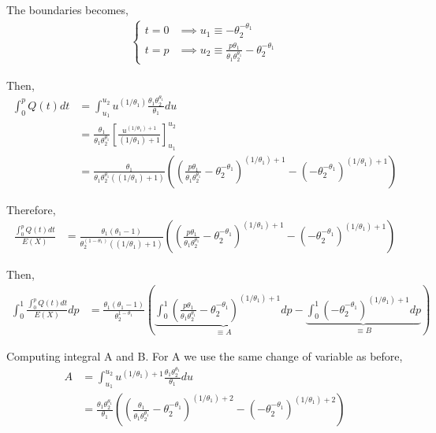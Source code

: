 \documentclass[10pt, a4paper, nofootinbib]{scrartcl}
\begin{document}
The boundaries becomes, 
\begin{align*}
  \begin{cases}
    t = 0 &\implies u_1 \equiv - \theta_2^{-\theta_1} \\
    t = p &\implies u_2 \equiv \frac{p \theta_1}{\theta_1 \theta_2^{\theta_1}} - \theta_2^{-\theta_1}
  \end{cases}
\end{align*}

Then, 
\begin{align*}
  \int_0^p Q(t) dt 
    &= \int_{u_1}^{u_2} u^{(1/\theta_1)} \frac{\theta_1 \theta_2^{\theta_1}}{\theta_1} du \\
    &= \frac{\theta_1}{\theta_1 \theta_2^{\theta_1}} \left[ \frac{u^{(1/\theta_1) + 1}}{(1/\theta_1) + 1} \right]_{u_1}^{u_2} \\
    &= \frac{\theta_1}{\theta_1 \theta_2^{\theta_1} ((1/\theta_1) + 1)} \left( \left( \frac{p \theta_1}{\theta_1 \theta_2^{\theta_1}} - \theta_2^{-\theta_1} \right)^{(1/\theta_1) + 1} - \left( - \theta_2^{-\theta_1} \right)^{(1/\theta_1) + 1} \right)
\end{align*}

Therefore, 
\begin{align*}
  \frac{\int_{0}^{p} Q(t) dt}{E(X)}
    &= \frac{\theta_1(\theta_1 - 1)}{\theta_2^{(1 - \theta_1)} ((1/\theta_1) + 1)} \left( \left( \frac{p \theta_1}{\theta_1 \theta_2^{\theta_1}} - \theta_2^{-\theta_1} \right)^{(1/\theta_1) + 1} - \left( - \theta_2^{-\theta_1} \right)^{(1/\theta_1) + 1} \right)
\end{align*}

Then,
\begin{align*}
  \int_{0}^{1} \frac{\int_{0}^{p} Q(t) dt}{E(X)} dp 
    &= \frac{\theta_1(\theta_1 - 1)}{\theta_2^{1 - \theta_1}} \left( \underbrace{\int_0^1 \left( \frac{p \theta_1}{\theta_1 \theta_2^{\theta_1}} - \theta_2^{-\theta_1} \right)^{(1/\theta_1) + 1} dp}_{\equiv A} - \underbrace{\int_0^1 \left( - \theta_2^{-\theta_1} \right)^{(1/\theta_1) + 1} dp}_{\equiv B} \right)
\end{align*}

Computing integral A and B. For A we use the same change of variable as before,
\begin{align*}
  A 
    &= \int_{u_1}^{u_2} u^{(1/\theta_1) + 1} \frac{\theta_1 \theta_2^{\theta_1}}{\theta_1} du \\
    &= \frac{\theta_1 \theta_2^{\theta_1}}{\theta_1} \left( \left( \frac{\theta_1}{\theta_1 \theta_2^{\theta_1}} - \theta_2^{-\theta_1} \right)^{(1/\theta_1) + 2} - \left( - \theta_2^{-\theta_1} \right)^{(1/\theta_1) + 2} \right)
\end{align*}
\end{document}
